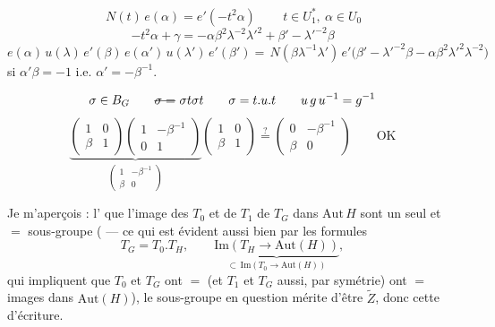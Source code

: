 \documentclass[11pt,a4paper]{article}
\begin{document}
\[
\boxed{\, N(t)\, e(\alpha) = e'(-t^2\alpha) \,} \qquad t \in U_1^*,\ \alpha \in U_0
\]
\[
-t^2\alpha + \gamma = -\alpha\beta^2\lambda^{-2}\lambda'^2 + \beta' - \lambda'^{-2}\beta
\]
\[
e(\alpha)\, u(\lambda)\, e'(\beta)\, e(\alpha')\, u(\lambda')\, e'(\beta')
= \boxed{\, N(\beta\lambda^{-1}\lambda')\, e'\bigl(\beta' - \lambda'^{-2}\beta - \alpha\beta^2\lambda'^2\lambda^{-2}\bigr) \,}
\]
si $\alpha'\beta = -1$ i.e. $\alpha' = -\beta^{-1}$.

\[
\sigma \in B_G \qquad \text{\struck{$\sigma =$}}\ \sigma t \sigma t \qquad \sigma = t . u . t \qquad u\, g\, u^{-1} = g^{-1}
\]
\[
\underbrace{\begin{pmatrix} 1 & 0 \\ \beta & 1 \end{pmatrix} \begin{pmatrix} 1 & -\beta^{-1} \\ 0 & 1 \end{pmatrix}}_{\begin{pmatrix} 1 & -\beta^{-1} \\ \beta & 0 \end{pmatrix}}
\begin{pmatrix} 1 & 0 \\ \beta & 1 \end{pmatrix}
\overset{?}{=} \begin{pmatrix} 0 & -\beta^{-1} \\ \beta & 0 \end{pmatrix} \qquad \text{OK}
\]


Je m'aperçois : l' que l'image des  $T_0$ et de $T_1$ de $T_G$ dans $\mathrm{Aut}\, H$ sont un seul et $=$ sous-groupe ( — ce qui est évident aussi bien par les formules 
\[
T_G = T_0 . T_H, \qquad \underbrace{\mathrm{Im}(T_H \to \mathrm{Aut}(H))}_{\subset\, \mathrm{Im}(T_0 \to \mathrm{Aut}(H))},
\]
qui impliquent que $T_0$ et $T_G$ ont   $=$ (et $T_1$ et $T_G$ aussi, par symétrie) ont $=$ images dans $\mathrm{Aut}(H)$), le sous-groupe en question  mérite d'être  $\tilde Z$, donc \struck{\ill{}} cette  d'écriture.
\end{document}

